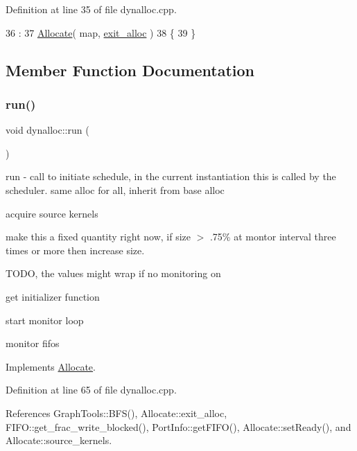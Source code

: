 Definition at line 35 of file dynalloc.\+cpp.


\begin{DoxyCode}
36                                                 :
37                         \hyperlink{class_allocate_ab2b82e7fab9d0fccb9702effec93917b}{Allocate}( map, \hyperlink{class_allocate_a4d10076b88ab1297c89b8a05e117b510}{exit\_alloc} )
38 \{
39 \}
\end{DoxyCode}


\subsection{Member Function Documentation}
\hypertarget{classdynalloc_a2a52b86ec09bd6dd52e49062137b2e37}{}\label{classdynalloc_a2a52b86ec09bd6dd52e49062137b2e37} 
\subsubsection{\texorpdfstring{run()}{run()}}
{\footnotesize\ttfamily void dynalloc\+::run (\begin{DoxyParamCaption}{ }\end{DoxyParamCaption})\hspace{0.3cm}{\ttfamily [virtual]}}

run -\/ call to initiate schedule, in the current instantiation this is called by the scheduler. same alloc for all, inherit from base alloc

acquire source kernels

make this a fixed quantity right now, if size $>$ .75\% at montor interval three times or more then increase size.

T\+O\+DO, the values might wrap if no monitoring on

get initializer function

start monitor loop

monitor fifo\textquotesingle{}s 

Implements \hyperlink{class_allocate_a44f9b51c382fec159233609e21b9d272}{Allocate}.



Definition at line 65 of file dynalloc.\+cpp.



References Graph\+Tools\+::\+B\+F\+S(), Allocate\+::exit\+\_\+alloc, F\+I\+F\+O\+::get\+\_\+frac\+\_\+write\+\_\+blocked(), Port\+Info\+::get\+F\+I\+F\+O(), Allocate\+::set\+Ready(), and Allocate\+::source\+\_\+kernels.


